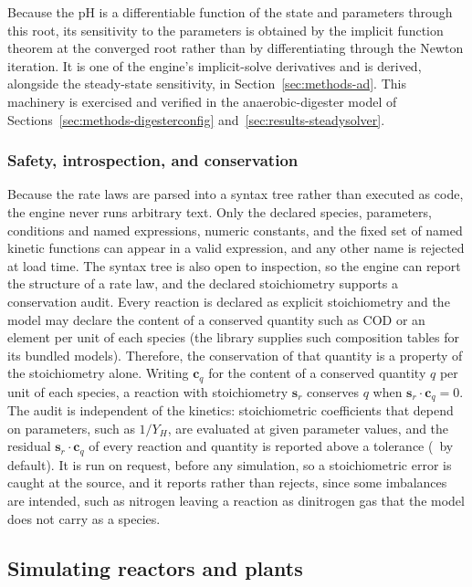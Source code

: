 \documentclass{article}
\begin{document}
Because the pH is a differentiable function of the state and parameters through this root, its sensitivity to the parameters is obtained by the implicit function theorem at the converged root rather than by differentiating through the Newton iteration. It is one of the engine's implicit-solve derivatives and is derived, alongside the steady-state sensitivity, in Section~\ref{sec:methods-ad}. This machinery is exercised and verified in the anaerobic-digester model of Sections~\ref{sec:methods-digesterconfig} and~\ref{sec:results-steadysolver}.

\subsubsection{Safety, introspection, and conservation}
\label{sec:methods-safety}

Because the rate laws are parsed into a syntax tree rather than executed as code, the engine never runs arbitrary text. Only the declared species, parameters, conditions and named expressions, numeric constants, and the fixed set of named kinetic functions can appear in a valid expression, and any other name is rejected at load time. The syntax tree is also open to inspection, so the engine can report the structure of a rate law, and the declared stoichiometry supports a conservation audit. Every reaction is declared as explicit stoichiometry and the model may declare the content of a conserved quantity such as COD or an element per unit of each species (the library supplies such composition tables for its bundled models). Therefore, the conservation of that quantity is a property of the stoichiometry alone. Writing \(\mathbf{c}_q\) for the content of a conserved quantity \(q\) per unit of each species, a reaction with stoichiometry \(\mathbf{s}_r\) conserves \(q\) when \(\mathbf{s}_r\!\cdot\!\mathbf{c}_q=0\). The audit is independent of the kinetics: stoichiometric coefficients that depend on parameters, such as \(1/Y_H\), are evaluated at given parameter values, and the residual \(\mathbf{s}_r\!\cdot\!\mathbf{c}_q\) of every reaction and quantity is reported above a tolerance (\ConsTol\ by default). It is run on request, before any simulation, so a stoichiometric error is caught at the source, and it reports rather than rejects, since some imbalances are intended, such as nitrogen leaving a reaction as dinitrogen gas that the model does not carry as a species.

\subsection{Simulating reactors and plants}
\label{sec:methods-assembly}
\end{document}
